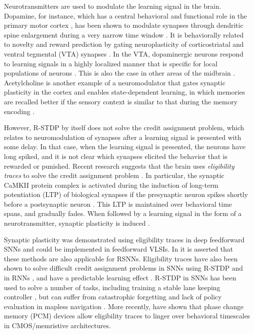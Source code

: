 Neurotransmitters are used to modulate the learning signal in the brain.
Dopamine, for instance, which has a central behavioral and functional role in the primary motor cortex \citep{barnes2005activity,dang2006disrupted}, has been shown to modulate synapses through dendritic spine enlargement during a very narrow time window \citep{dang2006disrupted}.
It is behaviorally related to novelty and reward prediction \citep{li2003dopamine,schultz2007behavioral} by gating neuroplasticity of corticostriatal \citep{reynolds2001cellular,reynolds2002dopamine} and ventral tegmental (VTA) synapses \citep{bao2001cortical}.
In the VTA, dopaminergic neurons respond to learning signals in a highly localized manner that is specific for local populations of neurons \citep{engelhard2019specialized}.
This is also the case in other areas of the midbrain \citep{roeper2013dissecting}.
Acetylcholine is another example of a neuromodulator that gates synaptic plasticity in the cortex and enables state-dependent learning, in which memories are recalled better if the sensory context is similar to that during the memory encoding \citep{shulz2000neuronal}.

However, R-STDP by itself does not solve the credit assignment problem, which relates to neuromodulation of synapses after a learning signal is presented with some delay.
In that case, when the learning signal is presented, the neurons have long spiked, and it is not clear which synapses elicited the behavior that is rewarded or punished.
Recent research suggests that the brain uses \emph{eligibility traces} \citep{izhikevich2007solving,florian2007reinforcement} to solve the credit assignment problem \citep{stolyarova2018solving,gerstner2018eligibility}.
In particular, the synaptic CaMKII protein complex is activated during the induction of long-term potentiation (LTP) of biological synapses if the presynaptic neuron spikes shortly before a postsynaptic neuron \citep{sanhueza2013camkii}.
This LTP is maintained over behavioral time spans, and gradually fades.
When followed by a learning signal in the form of a neurotransmitter, synaptic plasticity is induced \citep{yagishita2014critical,cassenaer2012conditional,gerstner2018eligibility}.

Synaptic plasticity was demonstrated using eligibility traces in deep feedforward SNNs \citep{zenke2018superspike,neftci2017event,kaiser2020synaptic} and could be implemented in feedforward VLSIs. In \citet{zenke2018superspike} it is asserted that these methods are also applicable for RSNNs.
Eligibility traces have also been shown to solve difficult credit assignment problems in SNNs using R-STDP \citep{legenstein2008learning, bellec2020solution} and in RNNs \citep{he2015distinct}, and have a predictable learning effect \citep{legenstein2008learning}.
R-STDP in SNNs has been used to solve a number of tasks, including training a stable lane keeping controller \citep{bing2020indirect}, but can suffer from catastrophic forgetting and lack of policy evaluation in mapless navigation \citep{bing2018end}.
More recently, \citet{demirag2021pcm} have shown that phase change memory (PCM) devices allow eligibility traces to linger over behavioral timescales in CMOS/memristive architectures.

